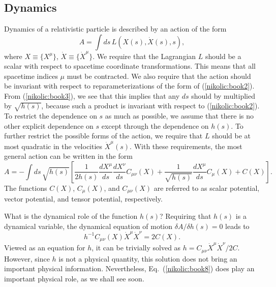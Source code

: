 \documentclass[12pt,twoside]{report} %
\begin{document}
\subsection{Dynamics}
\label{nikolic:Dynamics}

Dynamics of a relativistic particle is described by an action of the form
\begin{equation}\label{nikolic:book6}
 A=\int ds \, L(X(s),\dot{X}(s),s) ,
\end{equation}
where $X\equiv \{ X^{\mu} \}$, $\dot{X}\equiv \{ \dot{X}^{\mu} \}$.
We require that the Lagrangian $L$ should be a scalar with respect to spacetime coordinate
transformations. This means that all spacetime indices $\mu$ must be contracted.
We also require that the action should be invariant with respect to
reparameterizations of the form of (\ref{nikolic:book2}). From (\ref{nikolic:book3}), we see that this 
implies that any $ds$ should by multiplied by $\sqrt{h(s)}$, because such a product
is invariant with respect to (\ref{nikolic:book2}). To restrict the dependence on $s$
as much as possible, we assume that there is no other explicit dependence on $s$
except through the dependence on $h(s)$.
To further restrict the possible forms
of the action, we require that $L$ should be at most quadratic in the velocities 
$\dot{X}^{\mu}(s)$. With these requirements, the most general action can be written
in the form
\begin{equation}\label{nikolic:book7}
 A=-\int ds \, \sqrt{h(s)} \left[ \frac{1}{2h(s)}  
\frac{dX^\mu}{ds} \frac{dX^\nu}{ds} C_{\mu\nu}(X)
+\frac{1}{\sqrt{h(s)}} \frac{dX^\mu}{ds} C_{\mu}(X) + C(X) \right] .
\end{equation}
The functions $C(X)$, $C_{\mu}(X)$, and $C_{\mu\nu}(X)$ are referred to as
scalar potential, vector potential, and tensor potential, respectively.

What is the dynamical role of the function $h(s)$? Requiring that $h(s)$ is a
dynamical variable, the dynamical equation of motion $\delta A/\delta h(s)=0$
leads to
\begin{equation}\label{nikolic:book8}
 h^{-1}C_{\mu\nu}(X)\dot{X}^{\mu}\dot{X}^{\nu}=2C(X) .
\end{equation}
Viewed as an equation for $h$, it can be trivially solved as 
$h=C_{\mu\nu}\dot{X}^{\mu}\dot{X}^{\nu}/2C$. However,
since $h$ is not a physical quantity, this solution does not bring an important
physical information. Nevertheless, Eq.~(\ref{nikolic:book8}) does play an important
physical role, as we shall see soon.
\end{document}
